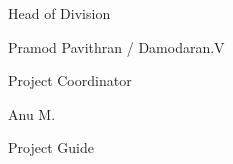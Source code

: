 \begin{center}
\begin{minipage}[b]{0.33333\textwidth}
Head of Division\\
\end{minipage}%
\begin{minipage}[b]{0.33333\textwidth}
\centering
Pramod Pavithran / Damodaran.V

Project Coordinator\\
\end{minipage}%
\begin{minipage}[b]{0.33333\textwidth}
\raggedleft
Anu M.

Project Guide\\
\end{minipage}

\end{center}

\vspace*{\fill}
